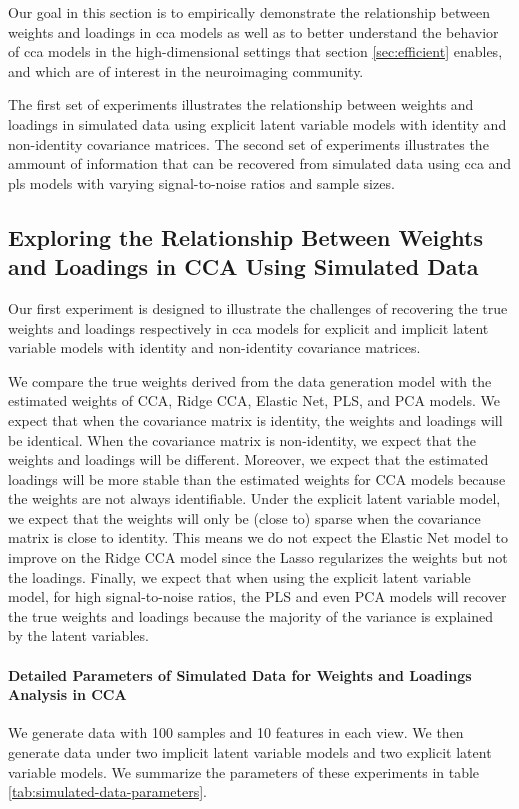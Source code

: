 Our goal in this section is to empirically demonstrate the relationship between weights and \gls{loadings} in \acrshort{cca} models as well as to better understand the behavior of \acrshort{cca} models in the high-dimensional settings that section \ref{sec:efficient} enables, and which are of interest in the neuroimaging community.

The first set of experiments illustrates the relationship between weights and \gls{loadings} in simulated data using explicit latent variable models with identity and non-identity covariance matrices.
The second set of experiments illustrates the ammount of information that can be recovered from simulated data using \acrshort{cca} and \acrshort{pls} models with varying signal-to-noise ratios and sample sizes.

\subsection{Exploring the Relationship Between Weights and Loadings in CCA Using Simulated Data}

Our first experiment is designed to illustrate the challenges of recovering the true weights and \gls{loadings} respectively in \acrshort{cca} models for explicit and implicit latent variable models with identity and non-identity covariance matrices.

We compare the true weights derived from the data generation model with the estimated weights of CCA, Ridge CCA, Elastic Net, PLS, and PCA models.
We expect that when the covariance matrix is identity, the weights and \gls{loadings} will be identical.
When the covariance matrix is non-identity, we expect that the weights and \gls{loadings} will be different.
Moreover, we expect that the estimated loadings will be more stable than the estimated weights for CCA models because the weights are not always identifiable.
Under the explicit latent variable model, we expect that the weights will only be (close to) sparse when the covariance matrix is close to identity.
This means we do not expect the Elastic Net model to improve on the Ridge CCA model since the Lasso regularizes the weights but not the \gls{loadings}.
Finally, we expect that when using the explicit latent variable model, for high signal-to-noise ratios, the PLS and even PCA models will recover the true weights and \gls{loadings} because the majority of the variance is explained by the latent variables.

\paragraph{Detailed Parameters of Simulated Data for Weights and Loadings Analysis in CCA} We generate data with 100 samples and 10 features in each view.
We then generate data under two implicit latent variable models and two explicit latent variable models.
We summarize the parameters of these experiments in table \ref{tab:simulated-data-parameters}.

